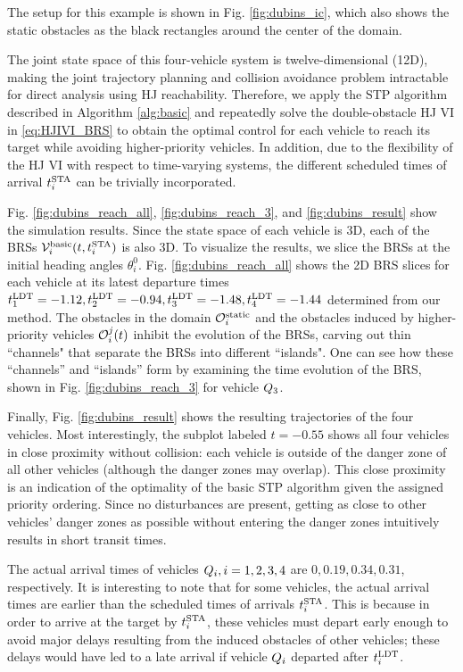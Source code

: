 The setup for this example is shown in Fig. \ref{fig:dubins_ic}, which also shows the static obstacles as the black rectangles around the center of the domain.

The joint state space of this four-vehicle system is twelve-dimensional (12D), making the joint trajectory planning and collision avoidance problem intractable for direct analysis using HJ reachability. Therefore, we apply the STP algorithm described in Algorithm \ref{alg:basic} and repeatedly solve the double-obstacle HJ VI in \eqref{eq:HJIVI_BRS} to obtain the optimal control for each vehicle to reach its target while avoiding higher-priority vehicles. In addition, due to the flexibility of the HJ VI with respect to time-varying systems, the different scheduled times of arrival $t^\text{STA}_i$ can be trivially incorporated. 

Fig. \ref{fig:dubins_reach_all}, \ref{fig:dubins_reach_3}, and \ref{fig:dubins_result} show the simulation results. Since the state space of each vehicle is 3D, each of the BRSs $\mathcal{V}_i^\text{basic}(t, t^\text{STA}_i)$ is also 3D. To visualize the results, we slice the BRSs at the initial heading angles $\theta_i^0$. Fig. \ref{fig:dubins_reach_all} shows the 2D BRS slices for each vehicle at its latest departure times $t^\text{LDT}_1=-1.12, t^\text{LDT}_2=-0.94,t^\text{LDT}_3=-1.48,t^\text{LDT}_4=-1.44$ determined from our method. The obstacles in the domain $\mathcal{O}^\text{static}_i$ and the obstacles induced by higher-priority vehicles $\mathcal{O}_i^j(t)$ inhibit the evolution of the BRSs, carving out thin ``channels" that separate the BRSs into different ``islands". One can see how these ``channels'' and ``islands'' form by examining the time evolution of the BRS, shown in Fig. \ref{fig:dubins_reach_3} for vehicle $Q_3$. 

Finally, Fig. \ref{fig:dubins_result} shows the resulting trajectories of the four vehicles. Most interestingly, the subplot labeled $t=-0.55$ shows all four vehicles in close proximity without collision: each vehicle is outside of the danger zone of all other vehicles (although the danger zones may overlap). This close proximity is an indication of the optimality of the basic STP algorithm given the assigned priority ordering. Since no disturbances are present, getting as close to other vehicles' danger zones as possible without entering the danger zones intuitively results in short transit times.

The actual arrival times of vehicles $Q_i,i=1,2,3,4$ are $0, 0.19, 0.34, 0.31$, respectively. It is interesting to note that for some vehicles, the actual arrival times are earlier than the scheduled times of arrivals $t^\text{STA}_i$. This is because in order to arrive at the target by $t^\text{STA}_i$, these vehicles must depart early enough to avoid major delays resulting from the induced obstacles of other vehicles; these delays would have led to a late arrival if vehicle $Q_i$ departed after $t^\text{LDT}_i$.

